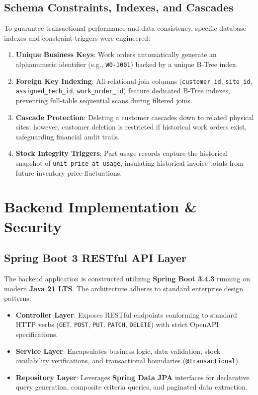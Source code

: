 \documentclass[12pt,a4paper,oneside]{report}
\begin{document}
\section{Schema Constraints, Indexes, and Cascades}
To guarantee transactional performance and data consistency, specific database indexes and constraint triggers were engineered:
\begin{enumerate}
    \item \textbf{Unique Business Keys}: Work orders automatically generate an alphanumeric identifier (e.g., \texttt{WO-1001}) backed by a unique B-Tree index.
    \item \textbf{Foreign Key Indexing}: All relational join columns (\texttt{customer\_id}, \texttt{site\_id}, \texttt{assigned\_tech\_id}, \texttt{work\_order\_id}) feature dedicated B-Tree indexes, preventing full-table sequential scans during filtered joins.
    \item \textbf{Cascade Protection}: Deleting a customer cascades down to related physical sites; however, customer deletion is restricted if historical work orders exist, safeguarding financial audit trails.
    \item \textbf{Stock Integrity Triggers}: Part usage records capture the historical snapshot of \texttt{unit\_price\_at\_usage}, insulating historical invoice totals from future inventory price fluctuations.
\end{enumerate}

\newpage
\chapter{Backend Implementation \& Security}

\section{Spring Boot 3 RESTful API Layer}
The backend application is constructed utilizing \textbf{Spring Boot 3.4.3} running on modern \textbf{Java 21 LTS}. The architecture adheres to standard enterprise design patterns:
\begin{itemize}
    \item \textbf{Controller Layer}: Exposes RESTful endpoints conforming to standard HTTP verbs (\texttt{GET}, \texttt{POST}, \texttt{PUT}, \texttt{PATCH}, \texttt{DELETE}) with strict OpenAPI specifications.
    \item \textbf{Service Layer}: Encapsulates business logic, data validation, stock availability verifications, and transactional boundaries (\texttt{@Transactional}).
    \item \textbf{Repository Layer}: Leverages \textbf{Spring Data JPA} interfaces for declarative query generation, composite criteria queries, and paginated data extraction.
\end{itemize}
\end{document}
